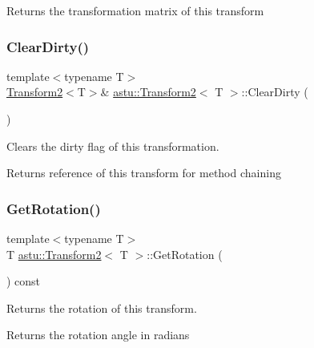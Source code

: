 \begin{DoxyReturn}{Returns}
the transformation matrix of this transform 
\end{DoxyReturn}
\mbox{\label{classastu_1_1Transform2_afbd879828c3b5de8767be64e11fc79ec}} 
\subsubsection{\texorpdfstring{Clear\+Dirty()}{ClearDirty()}}
{\footnotesize\ttfamily template$<$typename T$>$ \\
\hyperlink{classastu_1_1Transform2}{Transform2}$<$T$>$\& \hyperlink{classastu_1_1Transform2}{astu\+::\+Transform2}$<$ T $>$\+::Clear\+Dirty (\begin{DoxyParamCaption}{ }\end{DoxyParamCaption})\hspace{0.3cm}{\ttfamily [inline]}}

Clears the dirty flag of this transformation.

\begin{DoxyReturn}{Returns}
reference of this transform for method chaining 
\end{DoxyReturn}
\mbox{\label{classastu_1_1Transform2_a91764fcfd6b5213ede2168ce661ce364}} 
\subsubsection{\texorpdfstring{Get\+Rotation()}{GetRotation()}}
{\footnotesize\ttfamily template$<$typename T$>$ \\
T \hyperlink{classastu_1_1Transform2}{astu\+::\+Transform2}$<$ T $>$\+::Get\+Rotation (\begin{DoxyParamCaption}{ }\end{DoxyParamCaption}) const\hspace{0.3cm}{\ttfamily [inline]}}

Returns the rotation of this transform.

\begin{DoxyReturn}{Returns}
the rotation angle in radians 
\end{DoxyReturn}
\mbox{\label{classastu_1_1Transform2_ae2849a93a92f6f85ab2545e107f8d66f}} 
